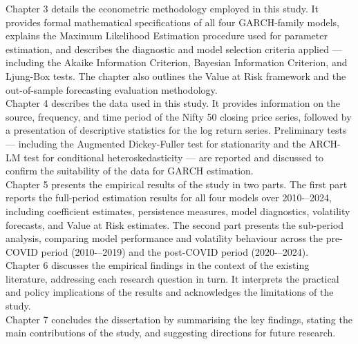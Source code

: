 Chapter 3 details the econometric methodology employed in this study. It provides formal mathematical specifications of all four GARCH-family models, explains the Maximum Likelihood Estimation procedure used for parameter estimation, and describes the diagnostic and model selection criteria applied — including the Akaike Information Criterion\citep{akaike1974}, Bayesian Information Criterion\citep{schwarz1978}, and Ljung-Box tests\citet{ljungbox1978}. The chapter also outlines the Value at Risk framework and the out-of-sample forecasting evaluation methodology.\\


Chapter 4 describes the data used in this study. It provides information on the source, frequency, and time period of the Nifty 50 closing price series, followed by a presentation of descriptive statistics for the log return series. Preliminary tests — including the Augmented Dickey-Fuller test for stationarity\citep{said1984testing} and the ARCH-LM test\citep{engle1982} for conditional heteroskedasticity — are reported and discussed to confirm the suitability of the data for GARCH estimation.\\
Chapter 5 presents the empirical results of the study in two parts. The first part reports the full-period estimation results for all four models over 2010-–2024, including coefficient estimates, persistence measures, model diagnostics, volatility forecasts, and Value at Risk estimates. The second part presents the sub-period analysis, comparing model performance and volatility behaviour across the pre-COVID period (2010-–2019) and the post-COVID period (2020-–2024).\\
Chapter 6 discusses the empirical findings in the context of the existing literature, addressing each research question in turn. It interprets the practical and policy implications of the results and acknowledges the limitations of the study.\\
Chapter 7 concludes the dissertation by summarising the key findings, stating the main contributions of the study, and suggesting directions for future research.





\vspace{0.4cm}
